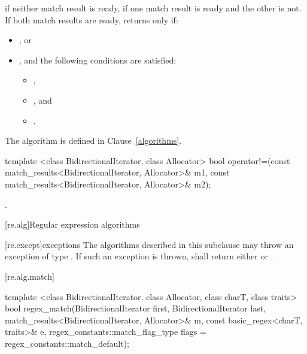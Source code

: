 \begin{itemdescr}
\pnum
\returns
{} if neither match result is ready,  if one match result is ready and the
other is not. If both match results are ready, returns  only if:

\begin{itemize}
\item
{}, or

\item
{}, and the following conditions are satisfied:

\begin{itemize}
\item
{},

\item
{}, and

\item
{}.
\end{itemize}
\end{itemize}
\begin{note} The algorithm  is defined in Clause~\ref{algorithms}. \end{note}
\end{itemdescr}

%
%
\begin{itemdecl}
template <class BidirectionalIterator, class Allocator>
bool operator!=(const match_results<BidirectionalIterator, Allocator>& m1,
                const match_results<BidirectionalIterator, Allocator>& m2);
\end{itemdecl}

\begin{itemdescr}
\pnum
\returns {}.
\end{itemdescr}

[re.alg]{Regular expression algorithms}

[re.except]{exceptions}
\pnum
The algorithms described in this subclause may throw an exception
of type . If such an exception  is thrown,
 shall return either 
or .

[re.alg.match]{}
%
\begin{itemdecl}
template <class BidirectionalIterator, class Allocator, class charT, class traits>
  bool regex_match(BidirectionalIterator first, BidirectionalIterator last,
                   match_results<BidirectionalIterator, Allocator>& m,
                   const basic_regex<charT, traits>& e,
                   regex_constants::match_flag_type flags =
                     regex_constants::match_default);
\end{itemdecl}

